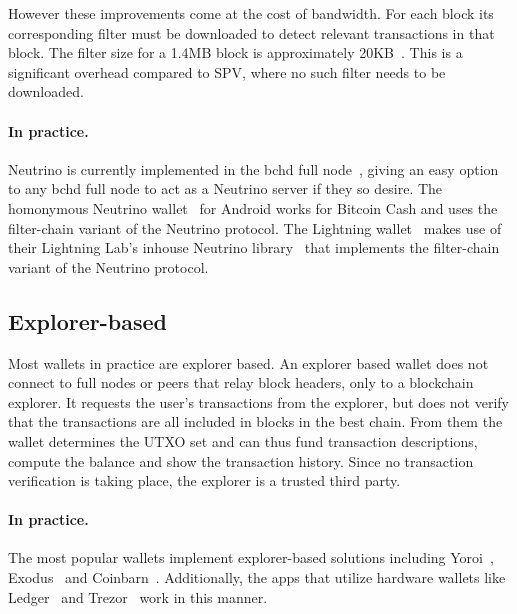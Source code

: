 However these improvements come at the cost of bandwidth. For each block its corresponding filter must be downloaded to detect relevant transactions in that block. The filter size for a 1.4MB block is approximately 20KB~\cite{jimmysong}. This is a significant overhead compared to SPV, where no such filter needs to be downloaded.

\paragraph{In practice.}
Neutrino is currently implemented in the bchd full node~\cite{bchd}, giving an easy option to any bchd full node to act as a Neutrino server if they so desire. The homonymous Neutrino wallet~\cite{neutrino-wallet} for Android works for Bitcoin Cash and uses the filter-chain variant of the Neutrino protocol. The Lightning wallet~\cite{lightning-wallet} makes use of their Lightning Lab's inhouse Neutrino library~\cite{neutrino-library} that implements the filter-chain variant of the Neutrino protocol.

\subsection{Explorer-based}
Most wallets in practice are explorer based. An explorer based wallet does not connect to full nodes or peers that relay block headers, only to a blockchain explorer. It requests the user's transactions from the explorer, but does not verify that the transactions are all included in blocks in the best chain. From them the wallet determines the UTXO set and can thus fund transaction descriptions, compute the balance and show the transaction history. Since no transaction verification is taking place, the explorer is a trusted third party.

\paragraph{In practice.}
The most popular wallets implement explorer-based solutions including Yoroi~\cite{yoroi}, Exodus~\cite{exodus} and Coinbarn~\cite{coinbarn}. Additionally, the apps that utilize hardware wallets like Ledger~\cite{ledger-live} and Trezor~\cite{trezor-beta} work in this manner.
